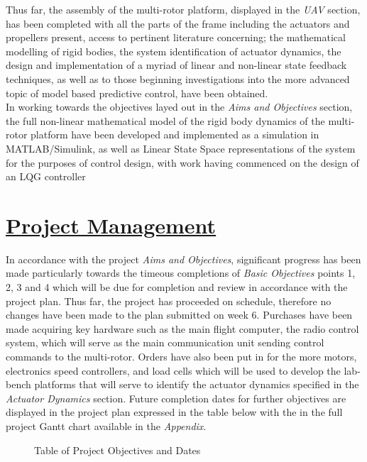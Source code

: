 \documentclass[12pt,a4paper,twoside]{report}
\begin{document}
			Thus far, the assembly of the multi-rotor platform, displayed in the \emph{UAV} section, has been completed with all the parts of the frame including the actuators and propellers present, access to pertinent literature concerning; the mathematical modelling of rigid bodies, the system identification of actuator dynamics, the design and implementation of a myriad of linear and non-linear state feedback techniques, as well as to those beginning investigations into the more advanced topic of model based predictive control, have been obtained. 
			\\
			In working towards the objectives layed out in the \emph{Aims and Objectives} section,  the full non-linear mathematical model of the rigid body dynamics of the multi-rotor platform have been developed and implemented as a simulation in MATLAB/Simulink, as well as Linear State Space representations of the system for the purposes of control design, with work having commenced on the design of an LQG controller
			\\
			
	\newpage
		
	\section*{\underline{Project Management}}
	
		In accordance with the project \emph{Aims and Objectives}, significant progress has been made particularly towards the timeous completions of \emph{Basic Objectives} points 1, 2, 3 and 4 which will be due for completion and review in accordance with the project plan. Thus far, the project has proceeded on schedule, therefore no changes have been made to the plan submitted on week 6. Purchases have been made acquiring key hardware such as the main flight computer, the radio control system, which will serve as the main communication unit sending control commands to the multi-rotor. Orders have also been put in for the more motors, electronics speed controllers, and load cells which will be used to develop the lab-bench platforms that will serve to identify the actuator dynamics specified in the \emph{Actuator Dynamics} section. Future completion dates for further objectives are displayed in the project plan expressed in the table below with the in the full project Gantt chart available in the \emph{Appendix}.
		\\  
		
		\begin{figure}[b]
			\centering 
			\caption{Table of Project Objectives and Dates}
			\label{fig:Project Objectives and Dates}
			
		\end{figure}
	
\end{document}
